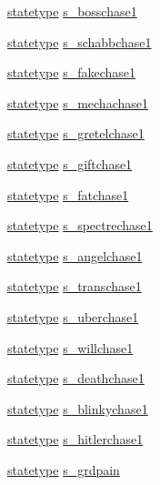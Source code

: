 \begin{DoxyCompactItemize}
\item 
\hyperlink{structstatestruct}{statetype} \hyperlink{WL__DEF_8H_a5135f3395ae6c6efc57951117610a58f}{s\_\-bosschase1}
\item 
\hyperlink{structstatestruct}{statetype} \hyperlink{WL__DEF_8H_aec6fd3f192ea893821d9f9707bcc714a}{s\_\-schabbchase1}
\item 
\hyperlink{structstatestruct}{statetype} \hyperlink{WL__DEF_8H_ad76ee345c327e96e3564960e280e5889}{s\_\-fakechase1}
\item 
\hyperlink{structstatestruct}{statetype} \hyperlink{WL__DEF_8H_a7fd4292362075e6baaf13d0148e5c631}{s\_\-mechachase1}
\item 
\hyperlink{structstatestruct}{statetype} \hyperlink{WL__DEF_8H_a6d420f4e0ef48ab7a3e7b67721af7a1e}{s\_\-gretelchase1}
\item 
\hyperlink{structstatestruct}{statetype} \hyperlink{WL__DEF_8H_a0a40f8197d12177d3e313cbed430ed05}{s\_\-giftchase1}
\item 
\hyperlink{structstatestruct}{statetype} \hyperlink{WL__DEF_8H_a7a5bc05a28fc2d5353459a65f27de274}{s\_\-fatchase1}
\item 
\hyperlink{structstatestruct}{statetype} \hyperlink{WL__DEF_8H_a81a2cd699e878abe5ac54a35a578e073}{s\_\-spectrechase1}
\item 
\hyperlink{structstatestruct}{statetype} \hyperlink{WL__DEF_8H_ad2ca6481223178a065274b53d384fb91}{s\_\-angelchase1}
\item 
\hyperlink{structstatestruct}{statetype} \hyperlink{WL__DEF_8H_a3a71868e4789a378146fb3ff9ea9b893}{s\_\-transchase1}
\item 
\hyperlink{structstatestruct}{statetype} \hyperlink{WL__DEF_8H_aee78561567802289ba74c431ef1418c2}{s\_\-uberchase1}
\item 
\hyperlink{structstatestruct}{statetype} \hyperlink{WL__DEF_8H_ae65fa4935118c69149160b6352fb70b3}{s\_\-willchase1}
\item 
\hyperlink{structstatestruct}{statetype} \hyperlink{WL__DEF_8H_a6852544a980ed5951be737b13c72faf3}{s\_\-deathchase1}
\item 
\hyperlink{structstatestruct}{statetype} \hyperlink{WL__DEF_8H_a2a2fe6ee0d30959e050f2865d457b112}{s\_\-blinkychase1}
\item 
\hyperlink{structstatestruct}{statetype} \hyperlink{WL__DEF_8H_aa89b8ca9d464e45092cc99529d5abef4}{s\_\-hitlerchase1}
\item 
\hyperlink{structstatestruct}{statetype} \hyperlink{WL__DEF_8H_a97e65436bab06912e56ddec59ee73a3e}{s\_\-grdpain}

\end{DoxyCompactItemize}

